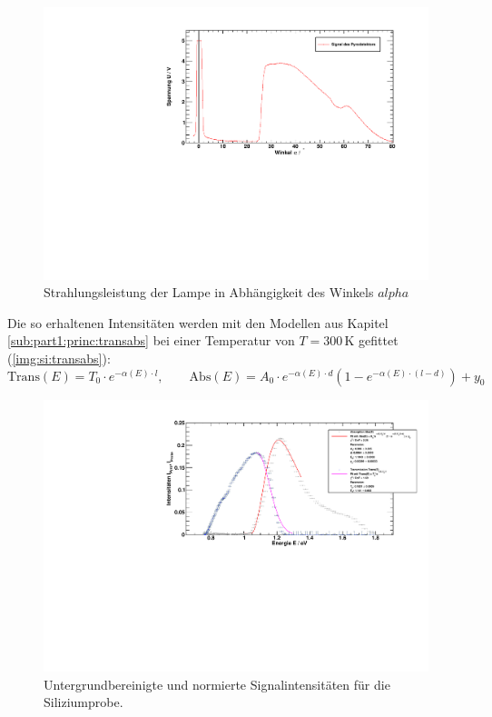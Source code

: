 \begin{figure}[H]
\begin{center}
  \includegraphics[width=\textwidth]{../img/part1/Si_Lampe_spectrum.pdf}
  \caption{Strahlungsleistung der Lampe in Abhängigkeit des Winkels $alpha$}
  \label{img:si:lampe}
\end{center}
\end{figure}

Die so erhaltenen Intensitäten werden mit den Modellen aus Kapitel \ref{sub:part1:princ:transabs} bei einer Temperatur von $T=300$\,K 
gefittet (\autoref{img:si:transabs}):
\begin{equation}
  \text{Trans}(E) = T_0 \cdot e^{- \alpha(E) \cdot l}, \qquad 
  \text{Abs}(E) = A_0 \cdot e^{- \alpha(E) \cdot d} \left( 1 - e^{- \alpha(E) \cdot (l - d)}  \right) + y_0
\end{equation}

\begin{figure}[H]
\begin{center}
  \includegraphics[width=\textwidth]{../img/part1/Si_fit_AbsTrans.pdf}
  \caption{Untergrundbereinigte und normierte Signalintensitäten für die Siliziumprobe.}
  \label{img:si:transabs}
\end{center}
\end{figure}

